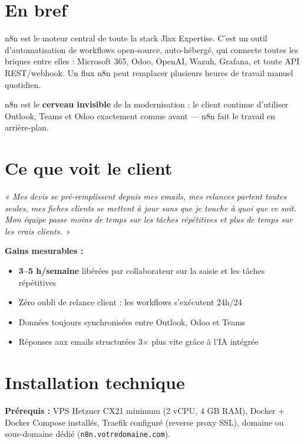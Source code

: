 \documentclass[11pt, a4paper]{article}
\begin{document}
\ficheHeader

\section*{En bref}
n8n est le moteur central de toute la stack Jlax Expertise. C'est un outil d'automatisation de workflows open-source, auto-hébergé, qui connecte toutes les briques entre elles : Microsoft 365, Odoo, OpenAI, Wazuh, Grafana, et toute API REST/webhook. Un flux n8n peut remplacer plusieurs heures de travail manuel quotidien.

\begin{pointcle}
  n8n est le \textbf{cerveau invisible} de la modernisation : le client continue d'utiliser Outlook, Teams et Odoo exactement comme avant — n8n fait le travail en arrière-plan.
\end{pointcle}

\section{Ce que voit le client}

\begin{clientbox}
  \textit{« Mes devis se pré-remplissent depuis mes emails, mes relances partent toutes seules, mes fiches clients se mettent à jour sans que je touche à quoi que ce soit. Mon équipe passe moins de temps sur les tâches répétitives et plus de temps sur les vrais clients. »}
\end{clientbox}

\textbf{Gains mesurables :}
\begin{itemize}
  \item \textbf{3–5 h/semaine} libérées par collaborateur sur la saisie et les tâches répétitives
  \item Zéro oubli de relance client : les workflows s'exécutent 24h/24
  \item Données toujours synchronisées entre Outlook, Odoo et Teams
  \item Réponses aux emails structurées 3× plus vite grâce à l'IA intégrée
\end{itemize}

\section{Installation technique}

\textbf{Prérequis :} VPS Hetzner CX21 minimum (2 vCPU, 4 GB RAM), Docker + Docker Compose installés, Traefik configuré (reverse proxy SSL), domaine ou sous-domaine dédié (\texttt{n8n.votredomaine.com}).
\end{document}
